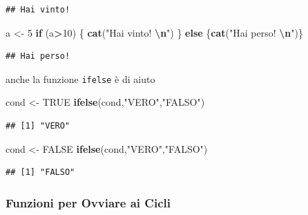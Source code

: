 \documentclass[
  11pt,
]{book}
\newenvironment{Shaded}{\begin{snugshade}}{\end{snugshade}}
\newcommand{\ConstantTok}[1]{\textcolor[rgb]{0.56,0.35,0.01}{#1}}
\newcommand{\ControlFlowTok}[1]{\textcolor[rgb]{0.13,0.29,0.53}{\textbf{#1}}}
\newcommand{\DecValTok}[1]{\textcolor[rgb]{0.00,0.00,0.81}{#1}}
\newcommand{\FunctionTok}[1]{\textcolor[rgb]{0.13,0.29,0.53}{\textbf{#1}}}
\newcommand{\NormalTok}[1]{#1}
\newcommand{\OtherTok}[1]{\textcolor[rgb]{0.56,0.35,0.01}{#1}}
\newcommand{\SpecialCharTok}[1]{\textcolor[rgb]{0.81,0.36,0.00}{\textbf{#1}}}
\newcommand{\StringTok}[1]{\textcolor[rgb]{0.31,0.60,0.02}{#1}}
\theoremstyle{mytheoremstyle}
\theoremstyle{mydefstyle}
\begin{document}
\begin{verbatim}
## Hai vinto!
\end{verbatim}

\begin{Shaded}
\begin{Highlighting}[]
\NormalTok{a }\OtherTok{\textless{}{-}} \DecValTok{5}
\ControlFlowTok{if}\NormalTok{ (a}\SpecialCharTok{\textgreater{}}\DecValTok{10}\NormalTok{) \{}
  \FunctionTok{cat}\NormalTok{(}\StringTok{"Hai vinto! }\SpecialCharTok{\textbackslash{}n}\StringTok{"}\NormalTok{)}
\NormalTok{\} }\ControlFlowTok{else}\NormalTok{ \{}\FunctionTok{cat}\NormalTok{(}\StringTok{"Hai perso! }\SpecialCharTok{\textbackslash{}n}\StringTok{"}\NormalTok{)\}}
\end{Highlighting}
\end{Shaded}

\begin{verbatim}
## Hai perso!
\end{verbatim}

anche la funzione \texttt{ifelse} è di aiuto

\begin{Shaded}
\begin{Highlighting}[]
\NormalTok{cond }\OtherTok{\textless{}{-}} \ConstantTok{TRUE}
\FunctionTok{ifelse}\NormalTok{(cond,}\StringTok{"VERO"}\NormalTok{,}\StringTok{"FALSO"}\NormalTok{)}
\end{Highlighting}
\end{Shaded}

\begin{verbatim}
## [1] "VERO"
\end{verbatim}

\begin{Shaded}
\begin{Highlighting}[]
\NormalTok{cond }\OtherTok{\textless{}{-}} \ConstantTok{FALSE}
\FunctionTok{ifelse}\NormalTok{(cond,}\StringTok{"VERO"}\NormalTok{,}\StringTok{"FALSO"}\NormalTok{)}
\end{Highlighting}
\end{Shaded}

\begin{verbatim}
## [1] "FALSO"
\end{verbatim}

\subsubsection{Funzioni per Ovviare ai Cicli}\label{funzioni-per-ovviare-ai-cicli}
\end{document}
